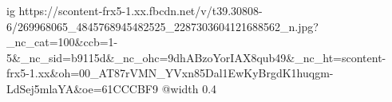  
 
 
 
 

\ifcmt
  ig https://scontent-frx5-1.xx.fbcdn.net/v/t39.30808-6/269968065_4845768945482525_2287303604121688562_n.jpg?_nc_cat=100&ccb=1-5&_nc_sid=b9115d&_nc_ohc=9dhABzoYorIAX8qub49&_nc_ht=scontent-frx5-1.xx&oh=00_AT87rVMN_YVxn85Dal1EwKyBrgdK1huqgm-LdSej5mlaYA&oe=61CCCBF9
  @width 0.4
\fi
